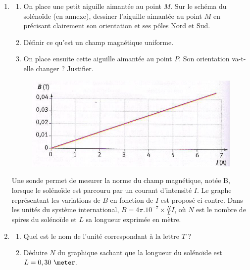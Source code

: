 \begin{enumerate}

\item \begin{enumerate}[label=(\alph*)]
\item On place une petit aiguille aimantée au point $M$. Sur le schéma du solénoïde (en annexe), dessiner l'aiguille aimantée au point $M$ en précisant clairement son orientation et ses pôles Nord et Sud.
\item Définir ce qu'est un champ magnétique uniforme.
\item On place ensuite cette aiguille aimantée au point $P$. Son orientation va-t-elle changer ? Justifier.
\end{enumerate}

\begin{figure}[h]
\begin{center}
\includegraphics[width=0.5\columnwidth]{images/Exo9_Champ_Magnetique}
\end{center}
\end{figure}

\vspace{0.3cm}

Une sonde permet de mesurer la norme du champ magnétique, notée B, lorsque le solénoïde est parcouru par un courant d'intensité $I$. Le graphe représentant les variations de $B$ en fonction de $I$ est proposé ci-contre. Dans les unités du système international, $B = 4\pi.10^{-7} \times \frac{N}{L} I$, où $N$ est le nombre de spires du solénoïde et $L$ sa longueur exprimée en mètre.

\newpage

\item \begin{enumerate}[label=(\alph*)]
\item Quel est le nom de l'unité correspondant à la lettre $T$ ?
\item Déduire $N$ du graphique sachant que la longueur du solénoïde est $L = 0,30\text{ }\meter$.
\end{enumerate}

\vspace{0.3cm}


\end{enumerate}
